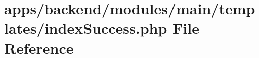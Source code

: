 \hypertarget{backend_2modules_2main_2templates_2index_success_8php}{\section{apps/backend/modules/main/templates/index\-Success.php File Reference}
\label{backend_2modules_2main_2templates_2index_success_8php}
}
